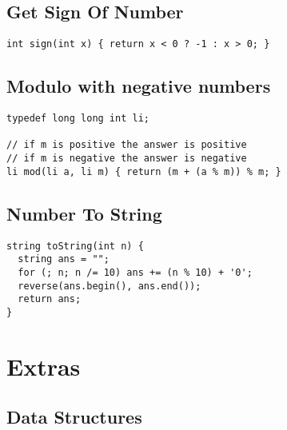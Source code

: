 \documentclass[twoside]{article}
\newcommand{\fileTitleStyle}{\large\underline}
\begin{document}
\begin{multicols*}{2}
\subsectionfont{\centering\bfseries\LARGE}
\subsectionfont{\fileTitleStyle}
\subsection*{Get Sign Of Number}
\begin{verbatim}
int sign(int x) { return x < 0 ? -1 : x > 0; }
\end{verbatim}

\subsectionfont{\centering\bfseries\LARGE}
\subsectionfont{\fileTitleStyle}
\subsection*{Modulo with negative numbers}
\begin{verbatim}
typedef long long int li;

// if m is positive the answer is positive
// if m is negative the answer is negative
li mod(li a, li m) { return (m + (a % m)) % m; }
\end{verbatim}

\subsectionfont{\centering\bfseries\LARGE}
\subsectionfont{\fileTitleStyle}
\subsection*{Number To String}
\begin{verbatim}
string toString(int n) {
  string ans = "";
  for (; n; n /= 10) ans += (n % 10) + '0';
  reverse(ans.begin(), ans.end());
  return ans;
}
\end{verbatim}

\end{multicols*}
\sectionfont{\centering\bfseries\Huge}
\vspace{1em}
\section*{Extras}
\vspace{3em}
\subsectionfont{\centering\bfseries\LARGE}
\vspace{0em}
\subsection*{Data Structures}
\vspace{2em}
\subsubsectionfont{\centering\bfseries\Large}
\vspace{0em}
\end{document}
